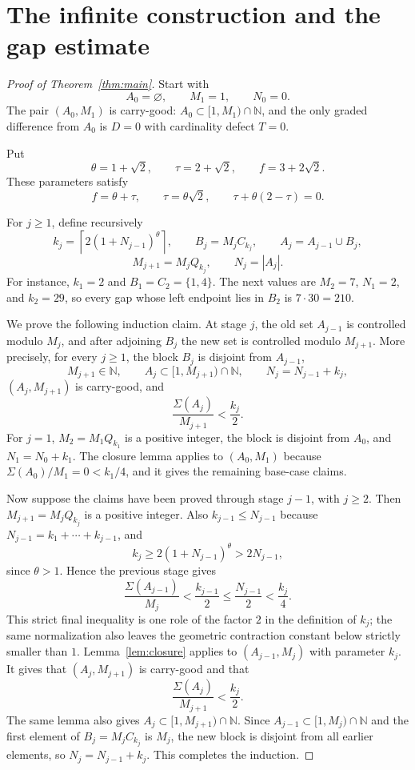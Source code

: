 \documentclass[11pt]{article}
\newcommand{\N}{\mathbb{N}}
\newcommand{\Sig}{\Sigma}
\begin{document}
\section{The infinite construction and the gap estimate}

\begin{proof}[Proof of Theorem~\ref{thm:main}]
Start with
\[
        A_0=\varnothing,
        \qquad
        M_1=1,
        \qquad
        N_0=0.
\]
The pair $(A_0,M_1)$ is carry-good: $A_0\subset[1,M_1)\cap\N$, and the only graded difference from $A_0$ is $D=0$ with cardinality defect $T=0$.

Put
\[
        \theta=1+\sqrt2,
        \qquad
        \tau=2+\sqrt2,
        \qquad
        f=3+2\sqrt2.
\]
These parameters satisfy
\[
        f=\theta+\tau,
        \qquad
        \tau=\theta\sqrt2,
        \qquad
        \tau+\theta(2-\tau)=0.
\]

For $j\ge1$, define recursively
\[
        k_j=\left\lceil 2(1+N_{j-1})^{\theta}\right\rceil,
        \qquad
        B_j=M_j C_{k_j},
        \qquad
        A_j=A_{j-1}\cup B_j,
\]
\[
        M_{j+1}=M_j Q_{k_j},
        \qquad
        N_j=|A_j|.
\]
For instance, $k_1=2$ and $B_1=C_2=\{1,4\}$.  The next values are $M_2=7$, $N_1=2$, and $k_2=29$, so every gap whose left endpoint lies in $B_2$ is $7\cdot 30=210$.

We prove the following induction claim.  At stage $j$, the old set $A_{j-1}$ is controlled modulo $M_j$, and after adjoining $B_j$ the new set is controlled modulo $M_{j+1}$.  More precisely, for every $j\ge1$, the block $B_j$ is disjoint from $A_{j-1}$,
\[
        M_{j+1}\in\N,
        \qquad
        A_j\subset[1,M_{j+1})\cap\N,
        \qquad
        N_j=N_{j-1}+k_j,
\]
$(A_j,M_{j+1})$ is carry-good, and
\[
        \frac{\Sig(A_j)}{M_{j+1}}<\frac{k_j}{2}.
\]
For $j=1$, $M_2=M_1Q_{k_1}$ is a positive integer, the block is disjoint from $A_0$, and $N_1=N_0+k_1$.  The closure lemma applies to $(A_0,M_1)$ because $\Sig(A_0)/M_1=0<k_1/4$, and it gives the remaining base-case claims.

Now suppose the claims have been proved through stage $j-1$, with $j\ge2$.  Then $M_{j+1}=M_j Q_{k_j}$ is a positive integer.  Also $k_{j-1}\le N_{j-1}$ because $N_{j-1}=k_1+\cdots+k_{j-1}$, and
\[
        k_j\ge 2(1+N_{j-1})^\theta>2N_{j-1},
\]
since $\theta>1$.  Hence the previous stage gives
\[
        \frac{\Sig(A_{j-1})}{M_j}<\frac{k_{j-1}}2\le \frac{N_{j-1}}2
        <\frac{k_j}{4}.
\]
This strict final inequality is one role of the factor $2$ in the definition of $k_j$; the same normalization also leaves the geometric contraction constant below strictly smaller than $1$.  Lemma~\ref{lem:closure} applies to $(A_{j-1},M_j)$ with parameter $k_j$.  It gives that $(A_j,M_{j+1})$ is carry-good and that
\[
        \frac{\Sig(A_j)}{M_{j+1}}<\frac{k_j}{2}.
\]
The same lemma also gives $A_j\subset[1,M_{j+1})\cap\N$.  Since $A_{j-1}\subset[1,M_j)\cap\N$ and the first element of $B_j=M_jC_{k_j}$ is $M_j$, the new block is disjoint from all earlier elements, so $N_j=N_{j-1}+k_j$.  This completes the induction.


\end{proof}
\end{document}

